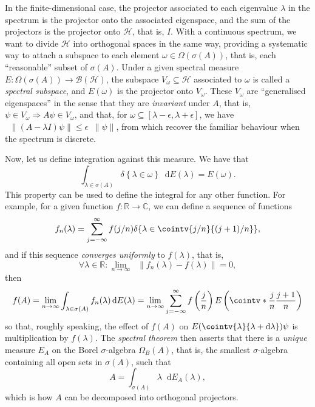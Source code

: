 \documentclass[10pt, a4paper]{article}
\numberwithin{equation}{section} %
\theoremstyle{definition}
\theoremstyle{plain}
\newcommand{\norm}[1]{\mathop{}\left\lVert#1\right\rVert}
\newcommand{\dif}{\mathop{}\!\mathrm{d}} %
\newcommand{\?}{\mathrel{?}} %
\newcommand{\R}{\mathbb{R}} %
\newcommand{\C}{\mathbb{C}} %
\newcommand{\indic}[1]{\delta{\left\{#1\right\}}} %
\newcommand{\Hs}{\mathcal{H}} %
\begin{document}
\begin{appendices}
                    In the finite-dimensional case, the projector associated to each eigenvalue \(\lambda\) in the spectrum is the projector onto the associated eigenspace, and the sum of the projectors is the projector onto \(\Hs\), that is, \(I\). With a continuous spectrum, we want to divide \(\Hs\) into orthogonal spaces in the same way, providing a systematic way to attach a subspace to each element \(\omega \in \Omega(\sigma(A))\), that is, each ``reasonable'' subset of \(\sigma(A)\). Under a given spectral measure \(E : \Omega(\sigma(A)) \to \mathcal{B}(\Hs)\), the subspace \(V_{\omega} \subseteq \Hs\) associated to \(\omega\) is called a \emph{spectral subspace}, and \(E(\omega)\) is the projector onto \(V_{\omega}\). These \(V_{\omega}\) are ``generalised eigenspaces'' in the sense that they are \emph{invariant} under \(A\), that is, \(\psi \in V_{\omega} \Rightarrow A\psi \in V_{\omega}\), and that, for \(\omega \subseteq [\lambda - \epsilon, \lambda + \epsilon]\), we have \(\norm{(A - \lambda I)\psi} \leq \epsilon\norm{\psi}\), from which recover the familiar behaviour when the spectrum is discrete.

                    Now, let us define integration against this measure. We have that
                    \[ \int_{\lambda \in \sigma(A)} \indic{\lambda \in \omega} \dif{E(\lambda)} = E(\omega). \]
                    This property can be used to define the integral for any other function. For example, for a given function \(f : \R \to \C\), we can define a sequence of functions
                    \[ f_n(\lambda) = \sum_{j = -\infty}^{\infty} f(j/n) \indic{\lambda \in \cointv{j/n}{(j+1)/n}}, \]
                    and if this sequence \emph{converges uniformly} to \(f(\lambda)\), that is,
                    \[ \forall \lambda \in \R : \lim_{n \to \infty} \norm{f_n(\lambda) - f(\lambda)} = 0, \]
                    then
                    \[ f(A) = \lim_{n\to\infty} \int_{\lambda \in \sigma(A)} f_n(\lambda) \dif{E(\lambda)} = \lim_{n\to\infty} \sum_{j = -\infty}^{\infty} f\left(\frac{j}{n}\right) E\left(\cointv*{\frac{j}{n}}{\frac{j+1}{n}}\right) \]
                    so that, roughly speaking, the effect of \(f(A)\) on \(E(\cointv{\lambda}{\lambda+\dif{\lambda}})\psi\) is multiplication by \(f(\lambda)\). The \emph{spectral theorem} then asserts that there is a \emph{unique} measure \(E_A\) on the Borel \(\sigma\)-algebra \(\Omega_B(A)\), that is, the smallest \(\sigma\)-algebra containing all open sets in \(\sigma(A)\), such that
                    \[ A = \int_{\sigma(A)} \lambda \dif{E_A(\lambda)}, \]
                    which is how \(A\) can be decomposed into orthogonal projectors.


\end{appendices}
\end{document}
